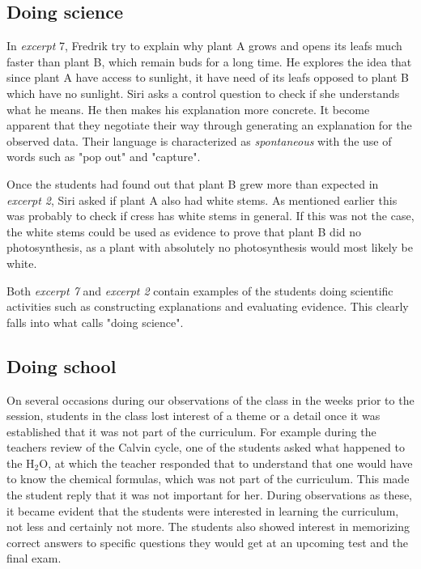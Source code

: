 \subsection{Doing science}
In \emph{excerpt} 7, Fredrik try to explain why plant A grows and opens its leafs much faster than plant B, which remain buds for a long time. He explores the idea that since plant A have access to sunlight, it have need of its leafs opposed to plant B which have no sunlight. Siri asks a control question to check if she understands what he means. He then makes his explanation more concrete. It become apparent that they negotiate their way through generating an explanation for the observed data. Their language is characterized as \emph{spontaneous} with the use of words such as "pop out" and "capture". 

Once the students had found out that plant B grew more than expected in \emph{excerpt 2}, Siri asked if plant A also had white stems. As mentioned earlier this was probably to check if cress has white stems in general. If this was not the case, the white stems could be used as evidence to prove that plant B did no photosynthesis, as a plant with absolutely no photosynthesis would most likely be white. 

Both \emph{excerpt 7} and \emph{excerpt 2} contain examples of the students doing scientific activities such as constructing explanations and evaluating evidence. This clearly falls into what \citet{jimenez2000doing} calls "doing science".

\subsection{Doing school}
On several occasions during our observations of the class in the weeks prior to the session, students in the class lost interest of a theme or a detail once it was established that it was not part of the curriculum. For example during the teachers review of the Calvin cycle, one of the students asked what happened to the $\text{H}_2\text{O}$, at which the teacher responded that to understand that one would have to know the chemical formulas, which was not part of the curriculum. This made the student reply that it was not important for her. During observations as these, it became evident that the students were interested in learning the curriculum, not less and certainly not more. The students also showed interest in memorizing correct answers to specific questions they would get at an upcoming test and the final exam. 

